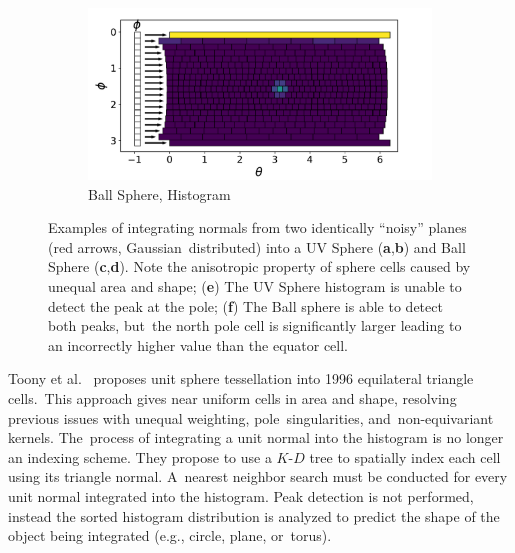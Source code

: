 \begin{figure}[H]
  \begin{subfigure}[t]{.49\linewidth}
    \centering\includegraphics[trim=0.1cm 0cm 0.99cm 0.6cm,width=.99\linewidth]{chapter_3_polylidar3d/imgs/ref_ga/strips_histogram.pdf}
    \caption{Ball Sphere, Histogram\label{fig:ch3_bg_ga_f}}\vspace{6pt}
  \end{subfigure}
  \caption{Examples of integrating normals from two identically ``noisy'' planes (red arrows, Gaussian~distributed) into a UV Sphere (\textbf{a},\textbf{b}) and Ball Sphere (\textbf{c},\textbf{d}). Note the anisotropic property of sphere cells caused by unequal area and shape; (\textbf{e}) The UV Sphere histogram is unable to detect the peak at the pole; (\textbf{f}) The Ball sphere is able to detect both peaks, but~the north pole cell is significantly larger
  leading to an incorrectly higher value than the equator cell.}\label{fig:ch3_bg_ga}
\end{figure}


Toony et al.~\cite{toony_describing_2015} proposes unit sphere tessellation into 1996 equilateral triangle cells.~This approach gives near uniform cells in area and shape, resolving previous issues with unequal weighting, pole~singularities, and~non-equivariant kernels. The~process of integrating a unit normal into the histogram is no longer an indexing scheme. They propose to use a $K$-$D$ tree to spatially index each cell using its triangle normal.  A~nearest neighbor search must be conducted for every unit normal integrated into the histogram. Peak detection is not performed, instead the sorted histogram distribution is analyzed to predict the shape of the object being integrated (e.g., circle, plane, or~torus). 

